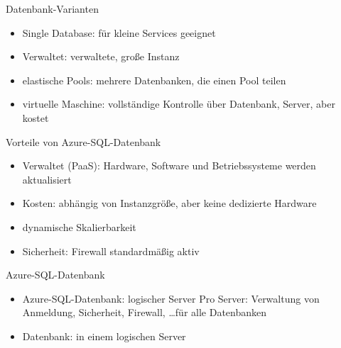 

\begin{flashcard}[Definition]{Datenbank-Varianten}
    \begin{itemize}
        \item Single Database:\newline
            für kleine Services geeignet
        \item Verwaltet:\newline
            verwaltete, große Instanz
        \item elastische Pools:\newline
            mehrere Datenbanken, die einen Pool teilen
        \item virtuelle Maschine:\newline
            vollständige Kontrolle über Datenbank, Server, aber kostet
    \end{itemize}
\end{flashcard}


\begin{flashcard}[Definition]{Vorteile von Azure-SQL-Datenbank}
    \begin{itemize}
        \item Verwaltet (PaaS): Hardware, Software und Betriebssysteme werden aktualisiert
        \item Kosten: abhängig von Instanzgröße, aber keine dedizierte Hardware
        \item dynamische Skalierbarkeit
        \item Sicherheit: Firewall standardmäßig aktiv
    \end{itemize}
\end{flashcard}

\begin{flashcard}[Definition]{Azure-SQL-Datenbank}
    \begin{itemize}
        \item Azure-SQL-Datenbank: logischer Server\newline
            Pro Server: Verwaltung von Anmeldung, Sicherheit, Firewall, \ldots für alle Datenbanken
        \item Datenbank: in einem logischen Server
    \end{itemize}
\end{flashcard}

